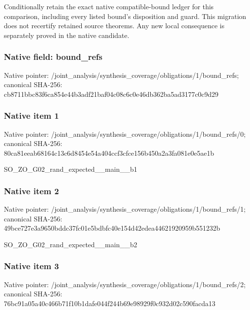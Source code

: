 \documentclass[10pt,a4paper]{article}
\begin{document}
\begingroup\raggedright\sloppy Conditionally retain the exact native compatible-bound ledger for this comparison,\allowbreak{} including every listed bound's disposition and guard. This migration does not recertify retained source theorems. Any new local consequence is separately proved in the native candidate.\par\endgroup

\subsubsection{Native field: bound\_\allowbreak{}refs}
Native pointer: /joint\_\allowbreak{}analysis/synthesis\_\allowbreak{}coverage/obligations/1/bound\_\allowbreak{}refs; canonical SHA-256: cb8711bbc83f6ca854e44b3adf21baf04c08c6c0e46db362ba5ad3177c0c9d29

\subsubsection{Native item 1}
Native pointer: /joint\_\allowbreak{}analysis/synthesis\_\allowbreak{}coverage/obligations/1/bound\_\allowbreak{}refs/0; canonical SHA-256: 80ca81eeab68164c13c6d8454e54a404ccf3cfce156b450a2a3fa081e0e5ae1b

\begingroup\raggedright\sloppy SO\_\allowbreak{}ZO\_\allowbreak{}G02\_\allowbreak{}rand\_\allowbreak{}expected\_\allowbreak{}\_\allowbreak{}main\_\allowbreak{}\_\allowbreak{}b1\par\endgroup

\subsubsection{Native item 2}
Native pointer: /joint\_\allowbreak{}analysis/synthesis\_\allowbreak{}coverage/obligations/1/bound\_\allowbreak{}refs/1; canonical SHA-256: 49bce727e3a9650bddc37fc01e5bdbfc40e154d42edea44621920959b551232b

\begingroup\raggedright\sloppy SO\_\allowbreak{}ZO\_\allowbreak{}G02\_\allowbreak{}rand\_\allowbreak{}expected\_\allowbreak{}\_\allowbreak{}main\_\allowbreak{}\_\allowbreak{}b2\par\endgroup

\subsubsection{Native item 3}
Native pointer: /joint\_\allowbreak{}analysis/synthesis\_\allowbreak{}coverage/obligations/1/bound\_\allowbreak{}refs/2; canonical SHA-256: 76bc91a05a40c466b71f10b1dafe044f244b69e98929f0c932d02c590facda13
\end{document}
